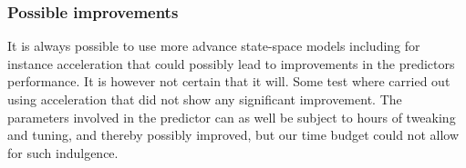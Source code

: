 \subsubsection{Possible improvements}
It is always possible to use more advance state-space models including for instance acceleration that could possibly lead to improvements in the predictors performance. It is however not certain that it will. Some test where carried out using acceleration that did not show any significant improvement. The parameters involved in the predictor can as well be subject to hours of tweaking and tuning, and thereby possibly improved, but our time budget could not allow for such indulgence. 















